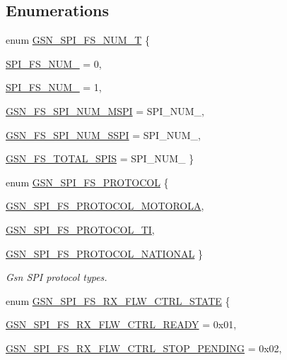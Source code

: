 \subsection*{Enumerations}
\begin{DoxyCompactItemize}
\item 
enum \hyperlink{a00589_af1ec0abe9693a9ef0c69dc5696f322b3}{GSN\_\-SPI\_\-FS\_\-NUM\_\-T} \{ \par
\hyperlink{a00589_af1ec0abe9693a9ef0c69dc5696f322b3a5d7aa35f065a1ac72dd770f596ffd07d}{SPI\_\-FS\_\-NUM\_} =  0, 
\par
\hyperlink{a00589_af1ec0abe9693a9ef0c69dc5696f322b3a55f7fa80292d830f6c9f483e95e7877a}{SPI\_\-FS\_\-NUM\_} =  1, 
\par
\hyperlink{a00589_af1ec0abe9693a9ef0c69dc5696f322b3a924a59a4f6058bb6e1a07ea5c98c4cf3}{GSN\_\-FS\_\-SPI\_\-NUM\_\-MSPI} =  SPI\_\-NUM\_, 
\par
\hyperlink{a00589_af1ec0abe9693a9ef0c69dc5696f322b3a5047ef0caf95c3406af03683ec89589a}{GSN\_\-FS\_\-SPI\_\-NUM\_\-SSPI} =  SPI\_\-NUM\_, 
\par
\hyperlink{a00589_af1ec0abe9693a9ef0c69dc5696f322b3ac7c9c44e1be32f49d3ca0bfa40c518b2}{GSN\_\-FS\_\-TOTAL\_\-SPIS} =  SPI\_\-NUM\_
 \}
\item 
enum \hyperlink{a00655_ga1185ce73b403aa52f97a2b0e4146a481}{GSN\_\-SPI\_\-FS\_\-PROTOCOL} \{ \par
\hyperlink{a00655_gga1185ce73b403aa52f97a2b0e4146a481a6aaa30d8afc18068857d91cdc540fbe1}{GSN\_\-SPI\_\-FS\_\-PROTOCOL\_\-MOTOROLA}, 
\par
\hyperlink{a00655_gga1185ce73b403aa52f97a2b0e4146a481abda6a064e31740f8ea4c6109cc2c6afe}{GSN\_\-SPI\_\-FS\_\-PROTOCOL\_\-TI}, 
\par
\hyperlink{a00655_gga1185ce73b403aa52f97a2b0e4146a481a5837f1f71b5fb093062115c2b401c183}{GSN\_\-SPI\_\-FS\_\-PROTOCOL\_\-NATIONAL}
 \}
\begin{DoxyCompactList}\small\item\em Gsn SPI protocol types. \end{DoxyCompactList}\item 
enum \hyperlink{a00589_a8fba8ef99bde7d11e4f9178b501de8cd}{GSN\_\-SPI\_\-FS\_\-RX\_\-FLW\_\-CTRL\_\-STATE} \{ \par
\hyperlink{a00589_a8fba8ef99bde7d11e4f9178b501de8cdab45dc9a97a6e19d6d90f78a66f22c323}{GSN\_\-SPI\_\-FS\_\-RX\_\-FLW\_\-CTRL\_\-READY} =  0x01, 
\par
\hyperlink{a00589_a8fba8ef99bde7d11e4f9178b501de8cda12fe720018256d3108be1d5427ec3171}{GSN\_\-SPI\_\-FS\_\-RX\_\-FLW\_\-CTRL\_\-STOP\_\-PENDING} =  0x02, 

\end{DoxyCompactItemize}
